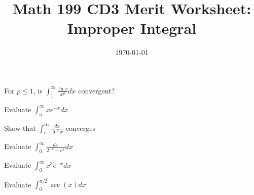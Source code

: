 
\usepackage{fullpage,amsmath,amssymb,amsthm}

\newcommand{\D}{\displaystyle}

\title{Math 199 CD3 Merit Worksheet: Improper Integral}
\date{\today}




\maketitle

	\be
		\item For $p \leq 1$, is $\int_1^\infty\frac{\ln x}{x^p}dx$ convergent?
		\vfill
		\item Evaluate $\int_a^\infty xe^{-x}dx$
		\vfill
		\item Show that $\int_e^\infty\frac{dx}{\ln^p x}$ converges
		\vfill
		\newpage
		\item Evaluate $\int_0^\infty\frac{dx}{2^{-x}+e^{x}}dx$
		\vfill
		\item Evaluate $\int_0^\infty x^3e^{-x}dx$
		\vfill
		\item Evaluate $\int_0^{\pi/2}\sec(x)dx$
		\vfill
	\ee

